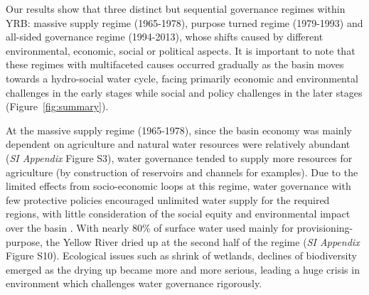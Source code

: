 \documentclass[9pt, twocolumn, twoside, lineno]{pnas-new}
\begin{document}
Our results show that three distinct but sequential governance regimes within YRB: massive supply regime (1965-1978), purpose turned regime (1979-1993) and all-sided governance regime (1994-2013), whose shifts caused by different environmental, economic, social or political aspects.
It is important to note that these regimes with multifaceted causes occurred gradually as the basin moves towards a hydro-social water cycle, facing primarily economic and environmental challenges in the early stages while social and policy challenges in the later stages (Figure~\ref{fig:summary}).

At the massive supply regime (1965-1978), since the basin economy was mainly dependent on agriculture and natural water resources were relatively abundant (\textit{SI Appendix} Figure S3), water governance tended to supply more resources for agriculture (by construction of reservoirs and channels for examples). 
Due to the limited effects from socio-economic loops at this regime, water governance with few protective policies encouraged unlimited water supply for the required regions, with little consideration of the social equity and environmental impact over the basin 
\cite{zhou2020}. 
With nearly 80\% of surface water used mainly for provisioning-purpose, the Yellow River dried up at the second half of the regime (\textit{SI Appendix} Figure S10). 
Ecological issues such as shrink of wetlands, declines of biodiversity emerged as the drying up became more and more serious, leading a huge crisis in environment which challenges water governance rigorously.
\end{document}
